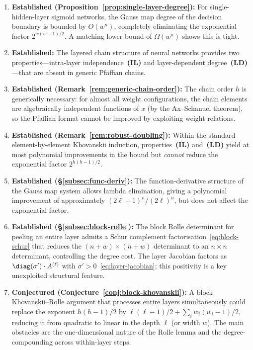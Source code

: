 \begin{enumerate}
  \item \textbf{Established (Proposition~\ref{prop:single-layer-degree}):} For single-hidden-layer sigmoid networks, the Gauss map degree of the decision boundary is bounded by $O(w^n)$, completely eliminating the exponential factor $2^{w(w-1)/2}$. A matching lower bound of $\Omega(w^n)$ shows this is tight.
  \item \textbf{Established:} The layered chain structure of neural networks provides two properties---intra-layer independence~\textbf{(IL)} and layer-dependent degree~\textbf{(LD)}---that are absent in generic Pfaffian chains.
  \item \textbf{Established (Remark~\ref{rem:generic-chain-order}):} The chain order $h$ is generically necessary: for almost all weight configurations, the chain elements are algebraically independent functions of $x$ (by the Ax--Schanuel theorem), so the Pfaffian format cannot be improved by exploiting weight relations.
  \item \textbf{Established (Remark~\ref{rem:robust-doubling}):} Within the standard element-by-element Khovanskii induction, properties~\textbf{(IL)} and~\textbf{(LD)} yield at most polynomial improvements in the bound but \emph{cannot} reduce the exponential factor $2^{h(h-1)/2}$.
  \item \textbf{Established (\S\ref{subsec:func-deriv}):} The function-derivative structure of the Gauss map system allows lambda elimination, giving a polynomial improvement of approximately $(2\ell+1)^n/(2\ell)^n$, but does not affect the exponential factor.
  \item \textbf{Established (\S\ref{subsec:block-rolle}):} The block Rolle determinant for peeling an entire layer admits a Schur complement factorisation~\eqref{eq:block-schur} that reduces the $(n+w) \times (n+w)$ determinant to an $n \times n$ determinant, controlling the degree cost. The layer Jacobian factors as $\diag(\sigma') \cdot A^{(\ell)}$ with $\sigma' > 0$~\eqref{eq:layer-jacobian}; this positivity is a key unexploited structural feature.
  \item \textbf{Conjectured (Conjecture~\ref{conj:block-khovanskii}):} A block Khovanskii--Rolle argument that processes entire layers simultaneously could replace the exponent $h(h-1)/2$ by $\ell(\ell-1)/2 + \sum_i w_i(w_i-1)/2$, reducing it from quadratic to linear in the depth $\ell$ (or width $w$). The main obstacles are the one-dimensional nature of the Rolle lemma and the degree-compounding across within-layer steps.

\end{enumerate}
